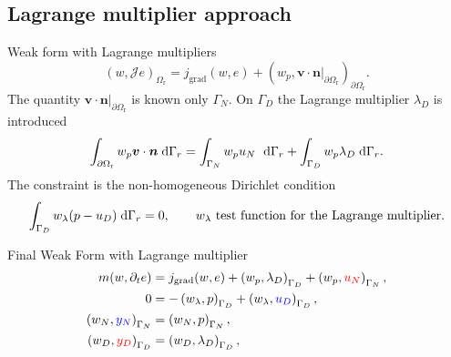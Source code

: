 \documentclass[aspectratio=169]{ISAE-Beamer}
\begin{document}
\subsection{Lagrange multiplier approach}

\begin{frame}{Weak form with Lagrange multipliers}
\setlength{\belowdisplayskip}{1pt}
\setlength{\abovedisplayskip}{1pt}
\begin{equation*}
\left(w, \mathcal{J} e \right)_{\Omega_{\text{r}}} =  j_{\text{grad}}(w, e) + \left(w_p, \bm{v}\cdot\bm{n}\vert_{\partial \Omega_{\text{r}}} \right)_{\partial \Omega_{\text{r}}}.
\end{equation*}
	The quantity $\bm{v}\cdot\bm{n}\vert_{\partial \Omega_{\text{r}}}$ is known only $\Gamma_N$. On $\Gamma_D$ the Lagrange multiplier $\lambda_D$ is introduced 
	\begin{equation*}
	\label{eq:bdint_dae}
	\int_{\partial \Omega_{\text{r}}} w_p \bm{v} \cdot \bm{n} \d{\Gamma_r} = \int_{\Gamma_N} w_p u_N \ \d{\Gamma_r} + \int_{\Gamma_D} w_p \lambda_D \d{\Gamma_r}.
	\end{equation*}
	The constraint  is the non-homogeneous Dirichlet condition
	\begin{equation*}
	\label{eq:wf_con}
	\int_{\Gamma_D} w_\lambda (p - u_D) \d{\Gamma_r} = 0, \qquad \text{$w_\lambda$ test function for the Lagrange multiplier.}
	\end{equation*}
	
	\begin{exampleblock}{Final Weak Form with Lagrange multiplier}
	\begin{equation*}
	\begin{aligned}
	m(w, \partial_t{e}) &= j_{\text{grad}}(w, e) + \left(w_p, \lambda_D \right)_{\Gamma_D} + \left(w_p, \textcolor{red}{u_N} \right)_{\Gamma_N}, \\
	0 &= - \left(w_\lambda, p \right)_{\Gamma_D} + \left(w_\lambda, \textcolor{blue}{u_D} \right)_{\Gamma_D}, \\
	\left(w_N, \textcolor{blue}{y_N} \right)_{\Gamma_N} &= \left(w_N, p \right)_{\Gamma_N}, \\
	\left(w_D, \textcolor{red}{y_D} \right)_{\Gamma_D} &= \left(w_D, \lambda_D \right)_{\Gamma_D}, 
	\end{aligned}
	\end{equation*}
	\end{exampleblock}


\end{frame}
\end{document}
